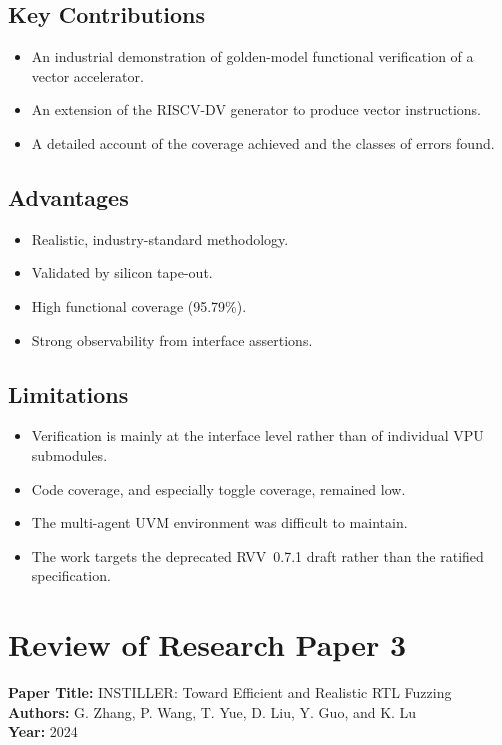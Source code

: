 \documentclass[12pt,a4paper]{report}
\begin{document}
\subsection{Key Contributions}
\begin{itemize}[nosep]
  \item An industrial demonstration of golden-model functional verification of a
        vector accelerator.
  \item An extension of the RISCV-DV generator to produce vector instructions.
  \item A detailed account of the coverage achieved and the classes of errors found.
\end{itemize}

\subsection{Advantages}
\begin{itemize}[nosep]
  \item Realistic, industry-standard methodology.
  \item Validated by silicon tape-out.
  \item High functional coverage (95.79\%).
  \item Strong observability from interface assertions.
\end{itemize}

\subsection{Limitations}
\begin{itemize}[nosep]
  \item Verification is mainly at the interface level rather than of individual VPU
        submodules.
  \item Code coverage, and especially toggle coverage, remained low.
  \item The multi-agent UVM environment was difficult to maintain.
  \item The work targets the deprecated RVV~0.7.1 draft rather than the ratified
        specification.
\end{itemize}

\section{Review of Research Paper 3}
\noindent\textbf{Paper Title:} INSTILLER: Toward Efficient and Realistic RTL Fuzzing\\
\textbf{Authors:} G. Zhang, P. Wang, T. Yue, D. Liu, Y. Guo, and K. Lu\\
\textbf{Year:} 2024
\end{document}
